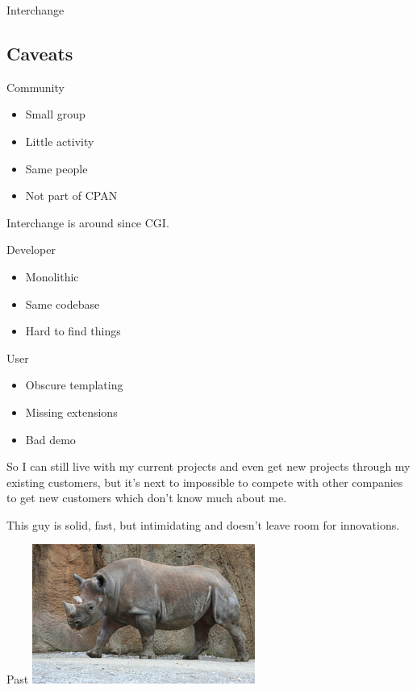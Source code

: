 \begin{frame}{Interchange}
\end{frame}


\subsection{Caveats}

\begin{frame}{Community}
\begin{itemize}
\item Small group
\item Little activity
\item Same people
\item Not part of CPAN
\end{itemize}
\end{frame}

Interchange is around since CGI.

\begin{frame}{Developer}
\begin{itemize}
\item Monolithic
\item Same codebase
\item Hard to find things
\end{itemize}
\end{frame}

\begin{frame}{User}
\begin{itemize}
\item Obscure templating
\item Missing extensions
\item Bad demo
\end{itemize}
\end{frame}

So I can still live with my current projects and even get
new projects through my existing customers, but it's next
to impossible to compete with other companies to get
new customers which don't know much about me.

This guy is solid, fast, but intimidating and
doesn't leave room for innovations.

\begin{frame}{Past}
  \includegraphics{rhino.jpg}
\end{frame}

